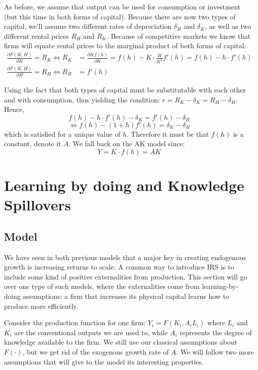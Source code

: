 \documentclass[12pt]{report}
\begin{document}
As before, we assume that output can be used for consumption or investment (but this time in both forms of capital). Because there are now two types of capital, we'll assume two different rates of depreciation $\delta_H$ and $\delta_K$, as well as two different rental prices $R_H$ and $R_K$. Because of competitive markets we know that firms will equate rental prices to the marginal product of both forms of capital: \begin{align*} 
\frac{\partial F(K,H)}{\partial K} = R_K \Leftrightarrow R_K & = \frac{\partial Kf(h)}{\partial K} = f(h) - K\cdot\frac{H}{K^2}f'(h) = f(h) - h\cdot f'(h) \\\frac{\partial F(K,H)}{\partial H} = R_H \Leftrightarrow R_H & = f'(h)
\end{align*}

Using the fact that both types of capital must be substitutable with each other and with consumption, thus yielding the condition: $r = R_K - \delta_K = R_H - \delta_H$. Hence, $$f(h) - h\cdot f'(h) - \delta_K = f'(h) - \delta_H $$ $$\Leftrightarrow f(h) - (1 + h)f'(h) = \delta_K - \delta_H $$ which is satisfied for a unique value of $h$. Therefore it must be that $f(h)$ is a constant, denote it $A$. We fall back on the AK model since: $$Y = K\cdot f(h) = AK $$

\section{Learning by doing and Knowledge Spillovers}

\subsection{Model}

We have seen in both previous models that a major key in creating endogenous growth is increasing returns to scale. A common way to introduce IRS is to include some kind of positive externalities from production. This section will go over one type of such models, where the externalities come from learning-by-doing assumptions: a firm that increases its physical capital learns how to produce more efficiently.

Consider the production function for one firm: $Y_i = F(K_i, A_iL_i)$ where $L_i$ and $K_i$ are the conventional outputs we are used to, while $A_i$ represents the degree of knowledge available to the firm. We still use our classical assumptions about $F(\cdot)$, but we get rid of the exogenous growth rate of $A$. We will follow two more assumptions that will give to the model its interesting properties.
\end{document}
